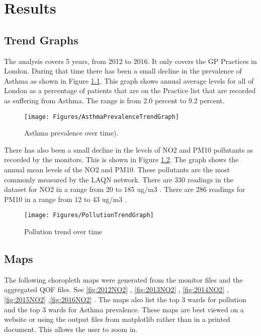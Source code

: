 
\chapter{Results} %

\label{Chapter5} %





\section{Trend Graphs}
The analysis covers 5 years, from 2012 to 2016. It only covers the GP Practices in London. During that time there has been a small decline in the prevalence of Asthma as shown in Figure \ref{fig:AsthmaPrevalence}. This graph shows annual average levels for all of London as a percentage of patients that are on the Practice list that are recorded as suffering from Asthma. The range is from 2.0 percent to 9.2 percent.

\begin{figure}
\centering
\texttt{[image: Figures/AsthmaPrevalenceTrendGraph]}
\decoRule
\caption[Asthma Prevalence]{Asthma prevalence over time).}
\label{fig:AsthmaPrevalence}
\end{figure}



There has also been a small decline in the levels of NO2 and PM10 pollutants as recorded by the monitors. This is shown in Figure \ref{fig:PollutionTrend}.
The graph shows the annual mean levels of the NO2 and PM10. These pollutants are the most commonly measured by the LAQN network. There are 330 readings in the dataset for NO2 in a range from 20 to 185 ug/m3 . There are 286 readings for PM10 in a range from 12 to 43 ug/m3 .

\begin{figure}
\centering
\texttt{[image: Figures/PollutionTrendGraph]}
\decoRule
\caption[Pollution trend]{Pollution trend over time}
\label{fig:PollutionTrend}
\end{figure}

\section{Maps}
The following choropleth maps were generated from the monitor files and the aggregated QOF files. 
See  \ref{fig:2012NO2} , \ref{fig:2013NO2} , \ref{fig:2014NO2} ,\ref{fig:2015NO2} ,\ref{fig:2016NO2} .
The maps also list the top 3 wards for pollution and the top 3 wards for Asthma prevalence. These maps are best viewed on a website or using the output files from matplotlib rather than in a printed document. This allows the user to zoom in.


